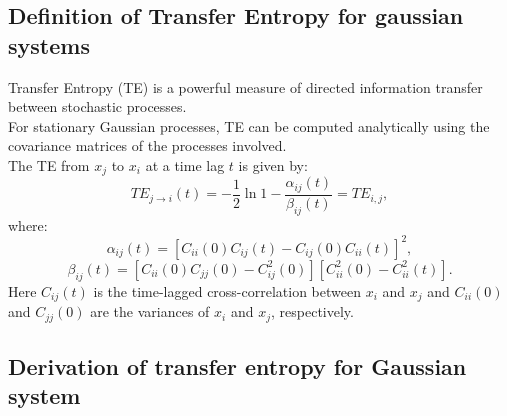 \documentclass[English, Lau, oneside]{sapthesis}
\begin{document}
\subsection{Definition of Transfer Entropy for gaussian systems}
\noindent Transfer Entropy (TE) is a powerful measure of directed information transfer between stochastic processes.\\
For stationary Gaussian processes, TE can be computed analytically using the covariance matrices of the processes involved. \\
The TE from \(x_j\) to \(x_i\) at a time lag \(t\) is given by:\cite{ref13}
\begin{equation}
TE_{j \to i}(t) = -\frac{1}{2} \ln{1 - \frac{\alpha_{ij}(t)}{\beta_{ij}(t)}}=TE_{i,j},\label{TE}
\end{equation}
where:
\begin{equation}
\alpha_{ij}(t) = \left[C_{ii}(0)C_{ij}(t) - C_{ij}(0)C_{ii}(t)\right]^2,\label{alpha}
\end{equation}
\begin{equation}
\beta_{ij}(t) = \left[C_{ii}(0)C_{jj}(0) - C_{ij}^2(0)\right]\left[C_{ii}^2(0) - C_{ii}^2(t)\right].\label{beta}
\end{equation}
Here \(C_{ij}(t)\) is the time-lagged cross-correlation between \(x_i\) and \(x_j\) and \(C_{ii}(0)\) and \(C_{jj}(0)\) are the variances of \(x_i\) and \(x_j\), respectively.

\subsection{Derivation of transfer entropy for Gaussian system}
\end{document}
